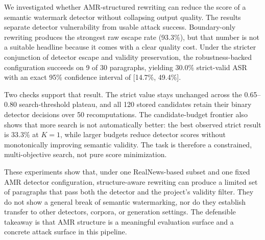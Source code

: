We investigated whether AMR-structured rewriting can reduce the score of a semantic watermark detector without collapsing output quality. The results separate detector vulnerability from usable attack success. Boundary-only rewriting produces the strongest raw escape rate (93.3\%), but that number is not a suitable headline because it comes with a clear quality cost. Under the stricter conjunction of detector escape and validity preservation, the robustness-backed configuration succeeds on 9 of 30 paragraphs, yielding 30.0\% strict-valid ASR with an exact 95\% confidence interval of [14.7\%, 49.4\%].

Two checks support that result. The strict value stays unchanged across the 0.65--0.80 search-threshold plateau, and all 120 stored candidates retain their binary detector decisions over 50 recomputations. The candidate-budget frontier also shows that more search is not automatically better: the best observed strict result is 33.3\% at $K=1$, while larger budgets reduce detector scores without monotonically improving semantic validity. The task is therefore a constrained, multi-objective search, not pure score minimization.

These experiments show that, under one RealNews-based subset and one fixed AMR detector configuration, structure-aware rewriting can produce a limited set of paragraphs that pass both the detector and the project's validity filter. They do not show a general break of semantic watermarking, nor do they establish transfer to other detectors, corpora, or generation settings. The defensible takeaway is that AMR structure is a meaningful evaluation surface and a concrete attack surface in this pipeline.
